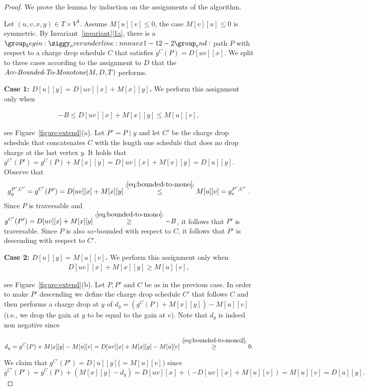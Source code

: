 \documentclass[11pt]{article}
\newcommand{\Extend}{\mbox{{\it Arc}-{\it Bounded}-{\it To}-{\it Monotone}}}
\newcommand\numge[1]{\stackrel{\scriptscriptstyle(\mkern-1.5mu#1\mkern-1.5mu)}{\ge}}
\newcommand\numle[1]{\stackrel{\scriptscriptstyle(\mkern-1.5mu#1\mkern-1.5mu)}{\le}}
\begin{document}
\begin{proof}
    We prove the lemma by induction on the assignments of the algorithm.

    Let $(u,v,x,y)\in T\times V^3$. Assume $M[u][v]\le 0$, the case $M[v][u]\le 0$ is symmetric.
    By Invariant~\ref{invariant}\ref{1a}, there is a $\overunderline{uvx}{1-1}{2-2}$ path $P$ with respect to a charge drop schedule $C$ that satisfies $g^{C}(P) = D[uv][x]$.
    We split to three cases according to the assignment to $D$ that the $\Extend(M,D,T)$ performs.

    \textbf{Case 1: $D[u][y] = D[uv][x] + M[x][y]$.} We perform this assignment only when 

    \begin{align}\label{eq:bounded-to-mono}
        -B\le  D[uv][x] + M[x][y] \le M[u][v],
    \end{align}
    
    see Figure~\ref{figure:extend}(a).
    Let $P' = P\mid y$ and let $C'$ be the charge drop schedule that concatenates $C$ with the length one schedule that does no drop charge at the last vertex $y$. It holds that $g^{C'}(P') = g^C(P)+M[x][y] = D[uv][x]+M[x][y]=D[u][y]$.  Observe that 
    \[g^{P',C'}_y = g^{C'}(P') = D[uv][x]+M[x][y] \numle{\ref{eq:bounded-to-mono}}  M[u][v] = g^{P',C'}_v  \ .\]
    Since $P$ is traversable
    and $g^{C'}(P') =  D[uv][x] + M[x][y] \numge{\ref{eq:bounded-to-mono}} -B$, it follows that $P'$ is traversable. Since $P$ is also $uv$-bounded with respect to $C$,  
    it follows that $P'$ is descending with respect to $C'$.  

    \textbf{Case 2: $D[u][y] =M[u][v]$.} We perform this assignment only when 
    \begin{align}\label{eq:bounded-to-mono2}
        D[uv][x] + M[x][y] \ge M[u][v],
    \end{align}
    
    see Figure~\ref{figure:extend}(b). Let $P,P'$ and $C$ be as in the previous case. In order to make $P'$ descending we define the charge drop schedule $C'$ that follows $C$ and then performs a charge drop at $y$ of $d_y = (g^C(P)+M[x][y]) - M[u][v]$ (i.e., we drop the gain at $y$ to be equal to the gain at $v$). Note that $d_y$ is indeed non  negative since

    \[d_y = g^C(P) + M[x][y] - M[u][v]
    = D[uv][x] + M[x][y] - M[u][v] \numge{\ref{eq:bounded-to-mono2}} 0. \]

    We claim that $g^{C'}(P')= D[u][y]$($=M[u][v]$) since \[
    g^{C'}(P')
    =g^C(P) + (M[x][y]-d_y)
    = D[uv][x] + (-D[uv][x] + M[u][v])
    =M[u][v]
    = D[u][y].
    \]



\end{proof}
\end{document}
